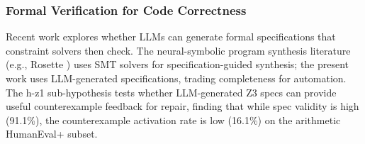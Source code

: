 \subsubsection{Formal Verification for Code Correctness}

Recent work explores whether LLMs can generate formal specifications that constraint solvers then check. The neural-symbolic program synthesis literature (e.g., Rosette \citep{Torlak2014Growing}) uses SMT solvers for specification-guided synthesis; the present work uses LLM-generated specifications, trading completeness for automation. The h-z1 sub-hypothesis tests whether LLM-generated Z3 specs can provide useful counterexample feedback for repair, finding that while spec validity is high (91.1\%), the counterexample activation rate is low (16.1\%) on the arithmetic HumanEval+ subset.

